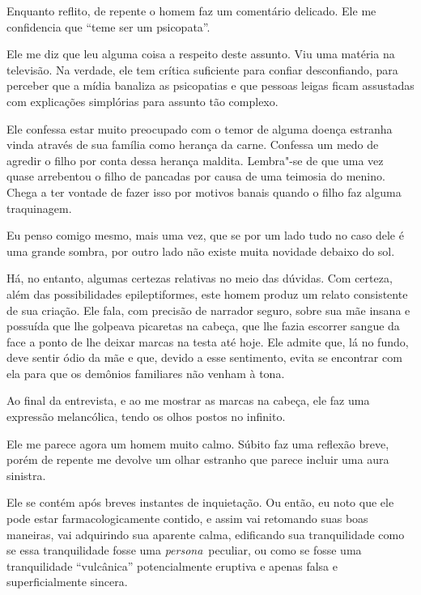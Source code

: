 Enquanto reflito, de repente o homem faz um comentário delicado. Ele me
confidencia que ``teme ser um psicopata''.

Ele me diz que leu alguma coisa a respeito deste assunto. Viu uma
matéria na televisão. Na verdade, ele tem crítica suficiente para
confiar desconfiando, para perceber que a mídia banaliza as psicopatias
e que pessoas leigas ficam assustadas com explicações simplórias para
assunto tão complexo.

Ele confessa estar muito preocupado com o temor de alguma doença
estranha vinda através de sua família como herança da carne. Confessa um
medo de agredir o filho por conta dessa herança maldita. Lembra"-se de
que uma vez quase arrebentou o filho de pancadas por causa de uma
teimosia do menino. Chega a ter vontade de fazer isso por motivos banais
quando o filho faz alguma traquinagem.

\asterisc{}

Eu penso comigo mesmo, mais uma vez, que se por um lado tudo no caso
dele é uma grande sombra, por outro lado não existe muita novidade
debaixo do sol.

Há, no entanto, algumas certezas relativas no meio das dúvidas. Com
certeza, além das possibilidades epileptiformes, este homem produz um
relato consistente de sua criação. Ele fala, com precisão de narrador
seguro, sobre sua mãe insana e possuída que lhe golpeava picaretas na
cabeça, que lhe fazia escorrer sangue da face a ponto de lhe deixar
marcas na testa até hoje. Ele admite que, lá no fundo, deve sentir ódio
da mãe e que, devido a esse sentimento, evita se encontrar com ela para
que os demônios familiares não venham à tona.

Ao final da entrevista, e ao me mostrar as marcas na cabeça, ele faz uma
expressão melancólica, tendo os olhos postos no infinito.

\asterisc{}

Ele me parece agora um homem muito calmo. Súbito faz uma reflexão breve,
porém de repente me devolve um olhar estranho que parece incluir uma
aura sinistra.

Ele se contém após breves instantes de inquietação. Ou então, eu noto
que ele pode estar farmacologicamente contido, e assim vai retomando
suas boas maneiras, vai adquirindo sua aparente calma, edificando sua
tranquilidade como se essa tranquilidade fosse uma
\emph{persona}~peculiar, ou como se fosse uma tranquilidade
``vulcânica'' potencialmente eruptiva e apenas falsa e superficialmente
sincera.~

